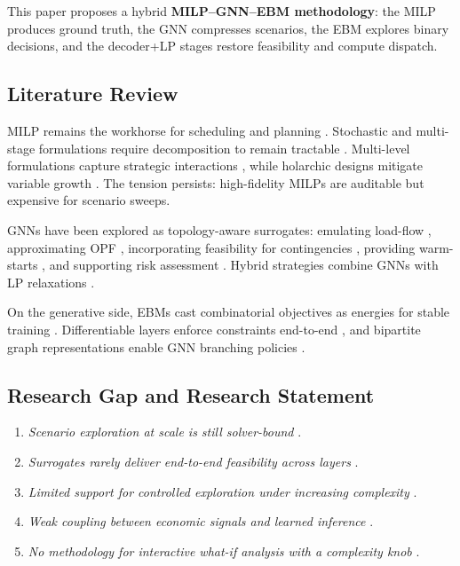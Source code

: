 \documentclass{article}
\let\parencite\citep
\begin{document}
This paper proposes a hybrid \textbf{MILP--GNN--EBM methodology}: the MILP produces ground truth, the GNN compresses scenarios, the EBM explores binary decisions, and the decoder+LP stages restore feasibility and compute dispatch.

\subsection{Literature Review}

MILP remains the workhorse for scheduling and planning \parencite{conejo_investment_2016}. Stochastic and multi-stage formulations require decomposition to remain tractable \parencite{micheli_two-stage_2023}. Multi-level formulations capture strategic interactions \parencite{hobbs_strategic_2000,pozo_three-level_2013,xia_scalable_2025}, while holarchic designs mitigate variable growth \parencite{marquant_holarchic_2017,yokoyama_hierarchical_2021}. The tension persists: high-fidelity MILPs are auditable but expensive for scenario sweeps.

GNNs have been explored as topology-aware surrogates: emulating load-flow \parencite{donon_graph_2019}, approximating OPF \parencite{owerko_optimal_2019}, incorporating feasibility for contingencies \parencite{liu_topology-aware_2023}, providing warm-starts \parencite{deihim_initial_2024}, and supporting risk assessment \parencite{zhang_graph_2024}. Hybrid strategies combine GNNs with LP relaxations \parencite{yang_stable_2025,park_confidence-aware_2023}.

On the generative side, EBMs cast combinatorial objectives as energies for stable training \parencite{sun_annealed_2022,goshvadi_discs_2023,mancilla_non-convex_2026}. Differentiable layers enforce constraints end-to-end \parencite{zeng_glinsat_2024}, and bipartite graph representations enable GNN branching policies \parencite{gasse_exact_2019}.

\subsection{Research Gap and Research Statement}

\begin{enumerate}[label=\textbf{(\arabic*)}, leftmargin=*, itemsep=2pt]
  \item \emph{Scenario exploration at scale is still solver-bound} \parencite{micheli_two-stage_2023,marquant_holarchic_2017}.
  \item \emph{Surrogates rarely deliver end-to-end feasibility across layers} \parencite{liu_topology-aware_2023,zhang_graph_2024}.
  \item \emph{Limited support for controlled exploration under increasing complexity} \parencite{sun_annealed_2022}.
  \item \emph{Weak coupling between economic signals and learned inference} \parencite{hobbs_strategic_2000,xia_scalable_2025}.
  \item \emph{No methodology for interactive what-if analysis with a complexity knob} \parencite{deihim_initial_2024,talebi_graph_2025}.
\end{enumerate}
\end{document}
